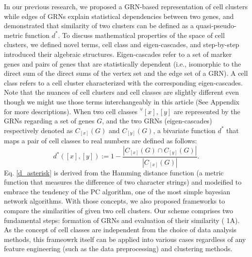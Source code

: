 \documentclass{article}
\begin{document}
In our previous research, we proposed a \ac{GRN}-based representation of cell clusters 
while edges of GRNs explain statistical dependencies between two genes, and demonstrated that similarity of two 
clusters can be defined as a quasi-pseudo-metric function $d^*$\cite{okano2023set}. To discuss mathematical properties of the space of 
cell clusters, we defined novel terms, cell class and eigen-cascades, and step-by-step introduced their algebraic 
structures. Eigen-cascades refer to a set of marker genes and pairs of genes that are statistically dependent (i.e., 
isomorphic to the direct sum of the direct sums of the vertex set and the edge set of a GRN). A cell class refers to 
a cell cluster characterized with the corresponding eigen-cascades. Note that the nuances of cell clusters and cell 
classes are slightly different even though we might use those terms interchangeably in this article (See Appendix 
for more descriptions). When two cell classes $^\forall[x], [y]$ are represented by the GRNs regarding a set of genes $G$, and 
the two GRNs (eigen-cascades) respectively denoted as $C_{[x]}(G)$ and $C_{[y]}(G)$, a bivariate function $d^*$ that maps a 
pair of cell classes to real numbers are defined as follows\cite{okano2023set}:
\begin{equation}\label{d_asterisk}
  d^*([x], [y]) := 1 - \frac{|C_{[x]}(G)\cap C_{[y]}(G)|}{|C_{[x]}(G)|}.
\end{equation}
Eq. \eqref{d_asterisk} is derived from the Hamming distance function (a metric function that measures the difference of two 
character strings) and modeified to embrace the tendency of the \ac{PC} algorithm, one of the most 
simple bayesian network algorithms\cite{okano2023set,bookstein2002generalized, spirtes2000causation}. With those concepts, we also proposed frameworks to compare the 
similarities of given two cell clusters. Our scheme comprises two fundamental steps: formation of GRNs and 
evaluation of their similarity (\figurename{ 1A}). As the concept of cell classes are independent from the choice of data 
analysis methods, this frameowrk itself can be applied into various cases regardless of any feature engineering (such 
as the data preprocessing) and clustering methods.
\end{document}
